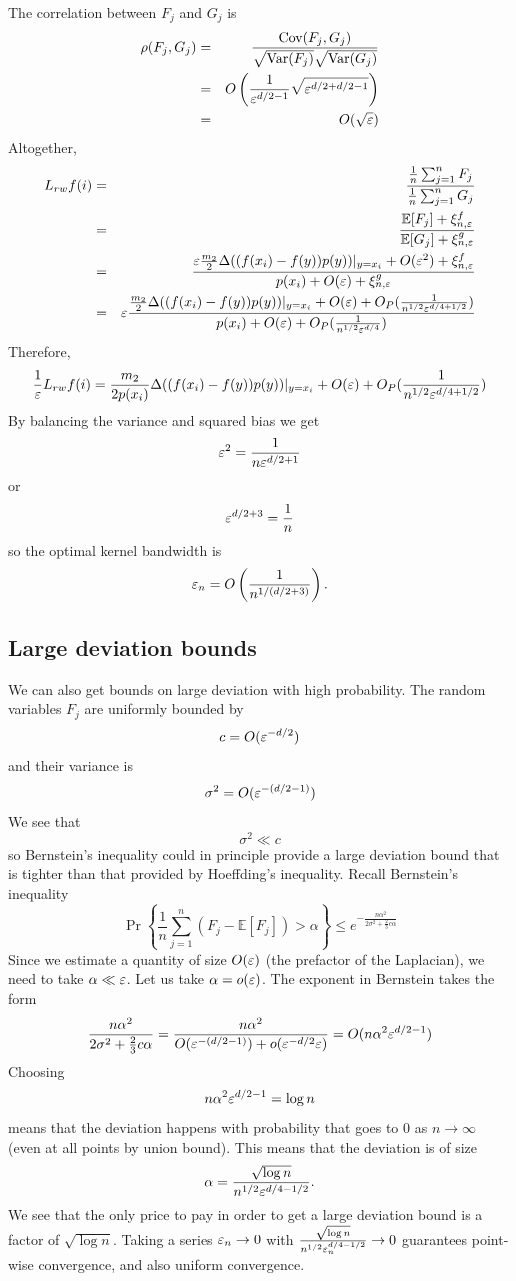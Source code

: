 The correlation between $F_j$ and $G_j$ is
\begin{eqnarray*}
\rho (F_j,G_j) &=& \frac{\text{Cov}(F_j,G_j)}{\sqrt{\text{Var}(F_j)}\sqrt{\text{Var}(G_j)}} \\
&=& O\left(\frac{1}{\varepsilon^{d/2-1}} \sqrt{\varepsilon^{d/2 + d/2 - 1}}\right) \\
&=& O(\sqrt{\varepsilon})
\end{eqnarray*}
Altogether,
\begin{eqnarray*}
L_{rw}f(i) &=& \frac{\frac{1}{n}\sum_{j=1}^n F_j}{\frac{1}{n}\sum_{j=1}^n G_j} \\
&=& \frac{\mathbb{E}[F_j] + \xi_{n,\varepsilon}^f}{\mathbb{E}[G_j] + \xi_{n,\varepsilon}^g} \\
&=& \frac{\varepsilon \frac{m_2}{2}\Delta ((f(x_i)-f(y))p(y))|_{y=x_i} + O(\varepsilon^2) + \xi_{n,\varepsilon}^f}{p(x_i) + O(\varepsilon) + \xi_{n,\varepsilon}^g} \\
&=& \varepsilon\frac{\frac{m_2}{2}\Delta ((f(x_i)-f(y))p(y))|_{y=x_i} + O(\varepsilon) + O_P(\frac{1}{n^{1/2}\varepsilon^{d/4+1/2}})}{p(x_i) + O(\varepsilon) + O_P(\frac{1}{n^{1/2}\varepsilon^{d/4}})}
\end{eqnarray*}
Therefore,
$$\frac{1}{\varepsilon}L_{rw}f(i) = \frac{m_2}{2p(x_i)}\Delta ((f(x_i)-f(y))p(y))|_{y=x_i} + O(\varepsilon) + O_P(\frac{1}{n^{1/2}\varepsilon^{d/4+1/2}})$$
By balancing the variance and squared bias we get
$$\varepsilon^2 = \frac{1}{n \varepsilon^{d/2+1}}$$
or
$$\varepsilon^{d/2+3} = \frac{1}{n}$$
so the optimal kernel bandwidth is
$$\varepsilon_n = O\left(\frac{1}{n^{1/(d/2+3)}}\right).$$

\subsection{Large deviation bounds}
We can also get bounds on large deviation with high probability. The random variables $F_j$ are uniformly bounded by $$c=O(\varepsilon^{-d/2})$$ and their variance is $$\sigma^2 = O(\varepsilon^{-(d/2-1)})$$ We see that $$\sigma^2 \ll c$$ so Bernstein's inequality could in principle provide a large deviation bound that is tighter than that provided by Hoeffding's inequality. Recall Bernstein's inequality
$$\Pr \left\{\frac{1}{n}\sum_{j=1}^n (F_j - \mathbb{E}[F_j]) > \alpha \right\} \leq e^{-\frac{n\alpha^2}{2\sigma^2 + \frac{2}{3}c\alpha}}$$
Since we estimate a quantity of size $O(\varepsilon)$ (the prefactor of the Laplacian), we need to take $\alpha \ll \varepsilon$. Let us take $\alpha=o(\varepsilon)$. The exponent in Bernstein takes the form
$$\frac{n\alpha^2}{2\sigma^2 + \frac{2}{3}c\alpha} = \frac{n \alpha^2}{O(\varepsilon^{-(d/2-1)}) + o(\varepsilon^{-d/2}\varepsilon)} = O(n\alpha^2\varepsilon^{d/2-1})$$
Choosing
$$n\alpha^2\varepsilon^{d/2-1} = \log n $$
means that the deviation happens with probability that goes to 0 as $n\to \infty$ (even at all points by union bound).
This means that the deviation is of size
$$\alpha = \frac{\sqrt{\log n}}{n^{1/2}\varepsilon^{d/4-1/2}}.$$
We see that the only price to pay in order to get a large deviation bound is a factor of $\sqrt{\log n}$. Taking a series $\varepsilon_n\to 0$ with $\frac{\sqrt{\log n}}{n^{1/2}\varepsilon_n^{d/4-1/2}}\to 0$ guarantees point-wise convergence, and also uniform convergence.

